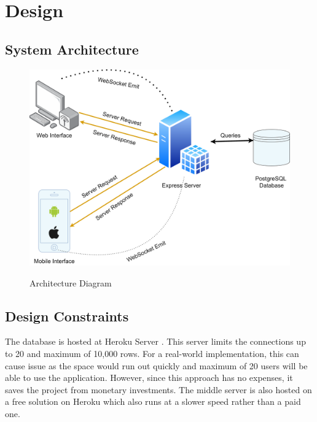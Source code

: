 \chapter{Design} \label{chap:design}


\section*{}
\section{System Architecture \cite{arch}}

\begin{figure}[H]
	\begin{center}
		{\includegraphics[scale=0.4]{figures/architecture.png}}
		\caption{Architecture Diagram}
	\end{center}
\end{figure}

\section{Design Constraints}
The database is hosted at Heroku Server \cite{heroku}. This server limits the connections up to 20 and maximum of 10,000 rows. For a real-world implementation, this can cause issue as the space would run out quickly and maximum of 20 users will be able to use the application. However, since this approach has no expenses, it saves the project from monetary investments. The middle server is also hosted on a free solution on Heroku which also runs at a slower speed rather than a paid one.

